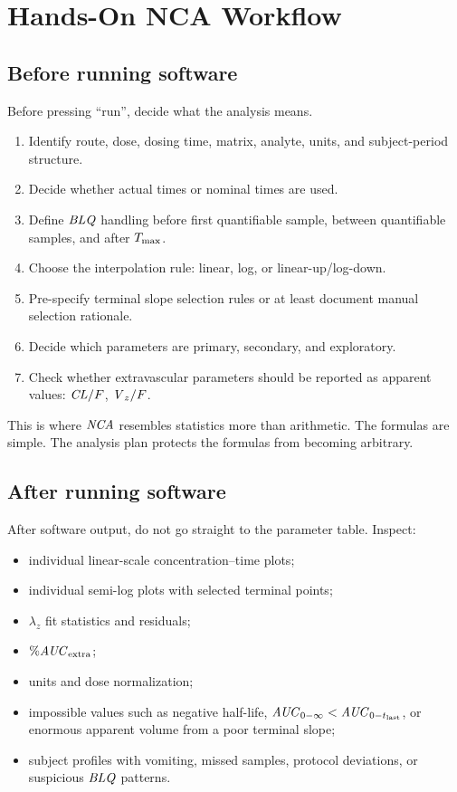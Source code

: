 \documentclass[a4paper]{article}
\newcommand{\CLF}{\ensuremath{\pksym{CL}/F}}
\newcommand{\VzF}{\ensuremath{\pksym{V}_z/F}}
\newcommand{\AUC}{\ensuremath{\pksym{AUC}}}
\newcommand{\AUClast}{\ensuremath{\pksym{AUC}_{0-t_{\pklab{last}}}}}
\newcommand{\AUCinf}{\ensuremath{\pksym{AUC}_{0-\infty}}}
\newcommand{\Tmax}{\ensuremath{T_{\pklab{max}}}}
\newcommand{\lambdaZ}{\ensuremath{\lambda_z}}
\newcommand{\NCA}{\ensuremath{\pksym{NCA}}}
\newcommand{\BLQ}{\ensuremath{\pksym{BLQ}}}
\begin{document}
\section{Hands-On NCA Workflow}

\subsection{Before running software}

Before pressing ``run'', decide what the analysis means.
\begin{enumerate}[leftmargin=2em]
  \item Identify route, dose, dosing time, matrix, analyte, units, and subject-period structure.
  \item Decide whether actual times or nominal times are used.
  \item Define \BLQ{} handling before first quantifiable sample, between quantifiable samples, and after \Tmax{}.
  \item Choose the interpolation rule: linear, log, or linear-up/log-down.
  \item Pre-specify terminal slope selection rules or at least document manual selection rationale.
  \item Decide which parameters are primary, secondary, and exploratory.
  \item Check whether extravascular parameters should be reported as apparent values: \(\CLF\), \(\VzF\).
\end{enumerate}

This is where \NCA{} resembles statistics more than arithmetic. The formulas are simple. The analysis plan protects the formulas from becoming arbitrary.

\subsection{After running software}

After software output, do not go straight to the parameter table. Inspect:
\begin{itemize}[leftmargin=2em]
  \item individual linear-scale concentration--time plots;
  \item individual semi-log plots with selected terminal points;
  \item \(\lambdaZ\) fit statistics and residuals;
  \item \(\%\AUC_{\pklab{extra}}\);
  \item units and dose normalization;
  \item impossible values such as negative half-life, \(\AUCinf<\AUClast\), or enormous apparent volume from a poor terminal slope;
  \item subject profiles with vomiting, missed samples, protocol deviations, or suspicious \BLQ{} patterns.
\end{itemize}
\end{document}
